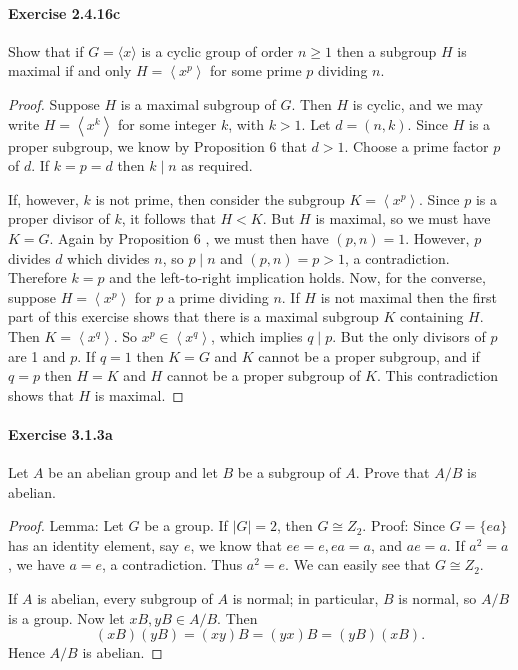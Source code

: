 \documentclass{article}
\theoremstyle{definition}
\begin{document}
\paragraph{Exercise 2.4.16c} Show that if $G=\langle x\rangle$ is a cyclic group of order $n \geq 1$ then a subgroup $H$ is maximal if and only $H=\left\langle x^{p}\right\rangle$ for some prime $p$ dividing $n$.
\begin{proof}
    Suppose $H$ is a maximal subgroup of $G$. Then $H$ is cyclic, and we may write $H=\left\langle x^k\right\rangle$ for some integer $k$, with $k>1$. Let $d=(n, k)$. Since $H$ is a proper subgroup, we know by Proposition 6 that $d>1$. Choose a prime factor $p$ of $d$. If $k=p=d$ then $k \mid n$ as required.

If, however, $k$ is not prime, then consider the subgroup $K=\left\langle x^p\right\rangle$. Since $p$ is a proper divisor of $k$, it follows that $H<K$. But $H$ is maximal, so we must have $K=G$. Again by Proposition 6 , we must then have $(p, n)=1$. However, $p$ divides $d$ which divides $n$, so $p \mid n$ and $(p, n)=p>1$, a contradiction. Therefore $k=p$ and the left-to-right implication holds.
Now, for the converse, suppose $H=\left\langle x^p\right\rangle$ for $p$ a prime dividing $n$. If $H$ is not maximal then the first part of this exercise shows that there is a maximal subgroup $K$ containing $H$. Then $K=\left\langle x^q\right\rangle$. So $x^p \in\left\langle x^q\right\rangle$, which implies $q \mid p$. But the only divisors of $p$ are 1 and $p$. If $q=1$ then $K=G$ and $K$ cannot be a proper subgroup, and if $q=p$ then $H=K$ and $H$ cannot be a proper subgroup of $K$. This contradiction shows that $H$ is maximal.
\end{proof}



\paragraph{Exercise 3.1.3a} Let $A$ be an abelian group and let $B$ be a subgroup of $A$. Prove that $A / B$ is abelian.
\begin{proof}
    Lemma: Let $G$ be a group. If $|G|=2$, then $G \cong Z_2$.
Proof: Since $G=\{e a\}$ has an identity element, say $e$, we know that $e e=e, e a=a$, and $a e=a$. If $a^2=a$, we have $a=e$, a contradiction. Thus $a^2=e$. We can easily see that $G \cong Z_2$.

If $A$ is abelian, every subgroup of $A$ is normal; in particular, $B$ is normal, so $A / B$ is a group. Now let $x B, y B \in A / B$. Then
$$
(x B)(y B)=(x y) B=(y x) B=(y B)(x B) .
$$
Hence $A / B$ is abelian.
\end{proof}
\end{document}
